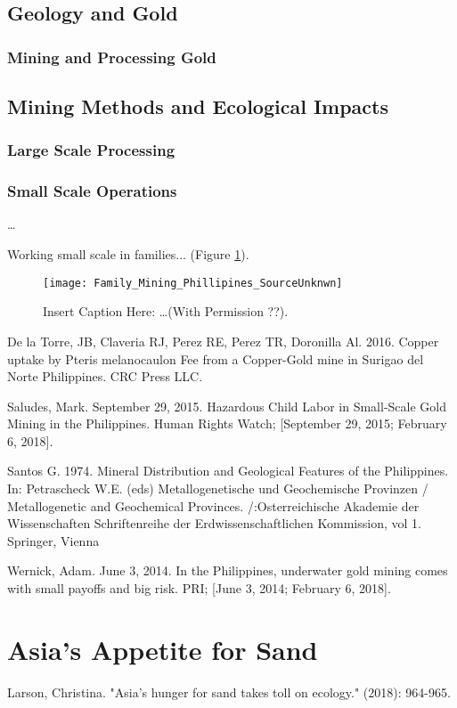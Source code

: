 \subsection{Geology and Gold}

\subsubsection{Mining and Processing Gold}

\subsection{Mining Methods and Ecological Impacts}

\subsubsection{Large Scale Processing}

\subsubsection{Small Scale Operations}

\citet{drasch2001mt} \ldots

Working small scale in families... (Figure \ref{fig:famliymining}).

\begin{figure}[h]
\texttt{[image: Family\_Mining\_Phillipines\_SourceUnknwn]}
\label{fig:famliymining}
\caption{Insert Caption Here: \ldots (With Permission ??).}
\end{figure}

\citep{de2016copper}

De la Torre, JB, Claveria RJ, Perez RE, Perez TR, Doronilla Al. 2016. Copper uptake by Pteris melanocaulon Fee from a Copper-Gold mine in Surigao del Norte Philippines. CRC Press LLC. 

Saludes, Mark. September 29, 2015. Hazardous Child Labor in Small-Scale Gold Mining in the Philippines. Human Rights Watch; [September 29, 2015; February 6, 2018].

\citet{santos1974mineral}

Santos G. 1974. Mineral Distribution and Geological Features of the Philippines. In: Petrascheck W.E. (eds) Metallogenetische und Geochemische Provinzen / Metallogenetic and Geochemical Provinces. /:Osterreichische Akademie der Wissenschaften Schriftenreihe der Erdwissenschaftlichen Kommission, vol 1. Springer, Vienna

Wernick, Adam. June 3, 2014. In the Philippines, underwater gold mining comes with small payoffs and big risk. PRI; [June 3, 2014; February 6, 2018]. 

\citet{drasch2001mt}

\section{Asia's Appetite for Sand}

Larson, Christina. "Asia's hunger for sand takes toll on ecology." (2018): 964-965.


%

